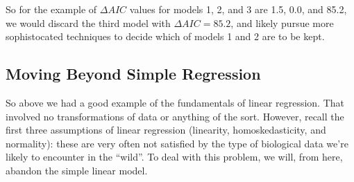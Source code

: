 \documentclass[
]{article}
\begin{document}
So for the example of \(\Delta AIC\) values for models 1, 2, and 3 are
1.5, 0.0, and 85.2, we would discard the third model with
\(\Delta AIC = 85.2\), and likely pursue more sophistocated techniques
to decide which of models 1 and 2 are to be kept.

\hypertarget{moving-beyond-simple-regression}{%
\subsection{Moving Beyond Simple
Regression}\label{moving-beyond-simple-regression}}

So above we had a good example of the fundamentals of linear regression.
That involved no transformations of data or anything of the sort.
However, recall the first three assumptions of linear regression
(linearity, homoskedasticity, and normality): these are very often not
satisfied by the type of biological data we're likely to encounter in
the ``wild''. To deal with this problem, we will, from here, abandon the
simple linear model.
\end{document}
